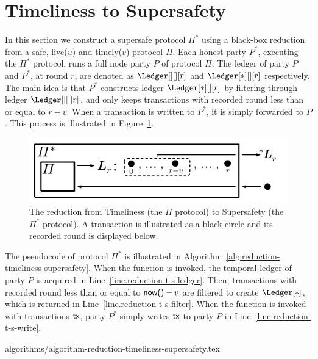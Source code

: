 \section{Timeliness to Supersafety}

In this section we construct a supersafe protocol
$\Pi^*$ using a black-box reduction from a safe, live($u$) and timely($v$)
protocol $\Pi$.
Each honest party $P^*$, executing the $\Pi^*$ protocol, runs a
full node party $P$ of protocol $\Pi$.
The ledger of party $P$ and $P^*$, at round $r$, are denoted as $\Ledger[][][r]$ and
$\Ledger[*][][r]$ respectively.
The main idea is that $P^*$ constructs ledger $\Ledger[*][][r]$
by filtering through ledger $\Ledger[][][r]$, and only keeps transactions
with recorded round less than or equal to $r - v$. When a transaction
is written to $P^*$, it is simply forwarded to $P$. This process is illustrated
in Figure~\ref{fig:reduction-timeliness-supersafety}.

\begin{figure}
  \centering
  \includegraphics[width=0.9\columnwidth,keepaspectratio]{figures/reduction-timeliness-supersafety.pdf}
  \caption{The reduction from Timeliness
    (the $\Pi$ protocol) to Supersafety (the $\Pi^*$ protocol). A transaction is illustrated
    as a black circle and its recorded round is displayed below.
  }

 \label{fig:reduction-timeliness-supersafety}
\end{figure}

The pseudocode of protocol $\Pi^*$ is illustrated in Algorithm~\ref{alg:reduction-timeliness-supersafety}.
When the \rread function is invoked, the temporal ledger of party $P$ is acquired
in Line~\ref{line.reduction-t-s-ledger}.
Then, transactions with recorded round less than or equal to $\textsf{now()} - v$ are
filtered to create $\Ledger[*]$, which is returned in Line~\ref{line.reduction-t-s-filter}.
When the \wwrite function is invoked with transactions $\textsf{tx}$, party $P^*$ simply writes $\textsf{tx}$
to party $P$ in Line~\ref{line.reduction-t-s-write}.

{algorithms/algorithm-reduction-timeliness-supersafety.tex}

